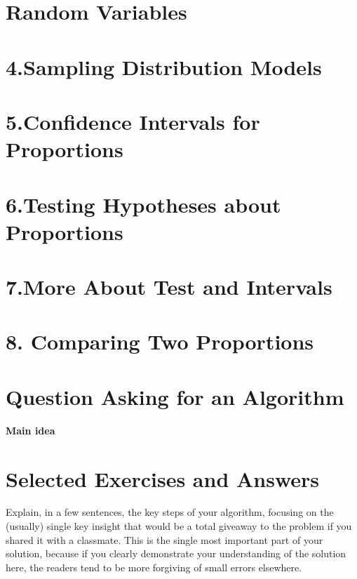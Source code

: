 \documentclass[12pt,a4paper]{article}
\begin{document}
\newpage
 \section*{Random Variables}
 \newpage
 \section*{4.Sampling Distribution Models}
  \newpage
\section*{5.Confidence Intervals for Proportions}
 \newpage
\section*{6.Testing Hypotheses about Proportions}
 \newpage
\section*{7.More About Test and Intervals}
 \newpage
\section*{8. Comparing Two Proportions}
\newpage 
\section*{Question Asking for an Algorithm}
\textbf{Main idea}\\
\section*{Selected Exercises and Answers}
 \renewcommand{\labelenumii}{\Roman{enumii}}

Explain, in a few sentences, the key steps of your algorithm, focusing on the (usually) single key insight that would be a total giveaway to the problem if you shared it with a classmate. This is the single most important part of your solution, because if you clearly demonstrate your understanding of the solution here, the readers tend to be more forgiving of small errors elsewhere.\\
\end{document}
